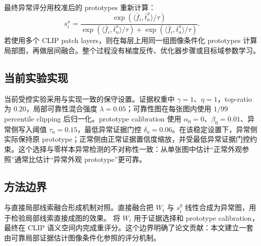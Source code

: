 最终异常评分用校准后的 prototypes 重新计算：
\begin{equation}
  s_i^{x}
  =
  \frac{\exp(\langle \bar f_i,\bar t_a^{x}\rangle/\tau)}
       {\exp(\langle \bar f_i,\bar t_n^{x}\rangle/\tau)+
        \exp(\langle \bar f_i,\bar t_a^{x}\rangle/\tau)}.
  \label{eq:final-score}
\end{equation}
若使用多个 CLIP patch layers，则在每层上用同一组图像条件化 prototypes 计算局部图，再做层间融合。整个过程没有梯度反传、优化器步骤或目标域参数学习。

\subsection{当前实验实现}

当前受控实验采用与实现一致的保守设置。证据权重中 $\gamma=1$、$\eta=1$，top-ratio 为 $0.20$，局部可靠性混合强度 $\lambda=0.05$；可靠性图在每张图内使用 $1/99$ percentile clipping 后归一化。prototype calibration 使用 $\alpha_0=0$、$\beta_0=0.01$、异常侧写入阈值 $\tau_a=0.15$，最低异常证据门控 $\delta_a=0.06$。在该稳定设置下，异常侧实际保持原 prototype；正常侧由正常证据置信度缩放，并受最低异常证据门控约束。这个选择与零样本异常检测的不对称性一致：从单张图中估计“正常外观参照”通常比估计“异常外观 prototype”更可靠。

\subsection{方法边界}

\method{} 与直接局部线索融合形成机制对照。直接融合把 $W_i$ 与 $s_i^0$ 线性合成为异常图，用于检验局部线索直接成图的效果。\method{} 将 $W_i$ 用于证据选择和 prototype calibration，最终在 CLIP 语义空间内完成重评分。这个边界明确了论文贡献：本文建立一套由可靠局部证据估计图像条件化参照的评分机制。
